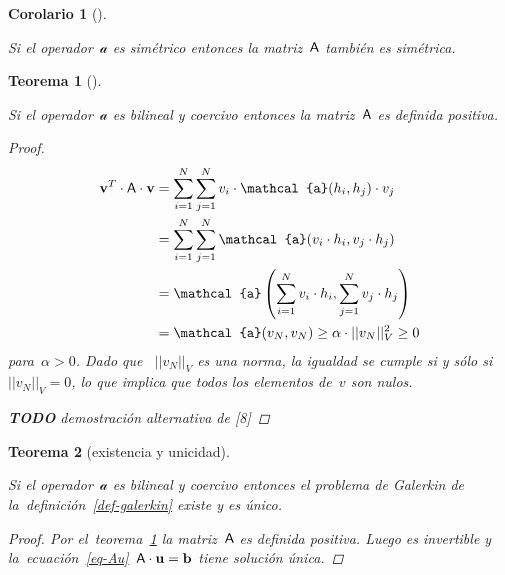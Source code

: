 \documentclass[
  12pt,
  a4paper,
  table]{scrbook}
\theoremstyle{plain}
\theoremstyle{definition}
\theoremstyle{plain}
\newtheorem{theorem}{Teorema}[chapter]
\theoremstyle{plain}
\newtheorem{corollary}{Corolario}[chapter]
\theoremstyle{remark}
\begin{document}
\begin{corollary}[]\protect\hypertarget{cor-A-simetria}{}\label{cor-A-simetria}

Si el operador~\(\mathcal{a}\) es simétrico entonces la
matriz~\(\mathsf{A}\) también es simétrica.

\end{corollary}

\begin{theorem}[]\protect\hypertarget{thm-A-spd}{}\label{thm-A-spd}

Si el operador~\(\mathcal{a}\) es bilineal y coercivo entonces la
matriz~\(\mathsf{A}\) es definida positiva.

\begin{proof}

\[
\begin{aligned}
\vec{v}^T \cdot \mat{A} \cdot \vec{v}
&= \sum_{i=1}^N \sum_{j=1}^N v_i \cdot \mathcal{a}(h_i, h_j) \cdot v_j \\
&= \sum_{i=1}^N \sum_{j=1}^N \mathcal{a}(v_i \cdot h_i, v_j \cdot h_j) \\
&= \mathcal{a} \left( \sum_{i=1}^N v_i \cdot h_i, \sum_{j=1}^N v_j \cdot h_j\right) \\
&= \mathcal{a}(v_N, v_N) \geq \alpha\cdot ||v_N||_V^2 \geq 0
\end{aligned}
\] para~\(\alpha > 0\). Dado que~ \(||v_N||_V\) es una norma, la
igualdad se cumple si y sólo si~\(||v_N||_V = 0\), lo que implica que
todos los elementos de~\(v\) son nulos.

\textbf{TODO} demostración alternativa de {[}8{]}

\end{proof}

\end{theorem}

\begin{theorem}[existencia y
unicidad]\protect\hypertarget{thm-galerkin-existencia-y-unicidad}{}\label{thm-galerkin-existencia-y-unicidad}

Si el operador~\(\mathcal{a}\) es bilineal y coercivo entonces el
problema de Galerkin de la~definición~\ref{def-galerkin} existe y es
único.

\begin{proof}

Por el~teorema~\ref{thm-A-spd} la matriz~\(\mathsf{A}\) es definida
positiva. Luego es invertible y
la~ecuación~\ref{eq-Au}~\(\mathsf{A} \cdot \mathbf{u} = \mathbf{b}\) tiene
solución única.

\end{proof}

\end{theorem}
\end{document}
